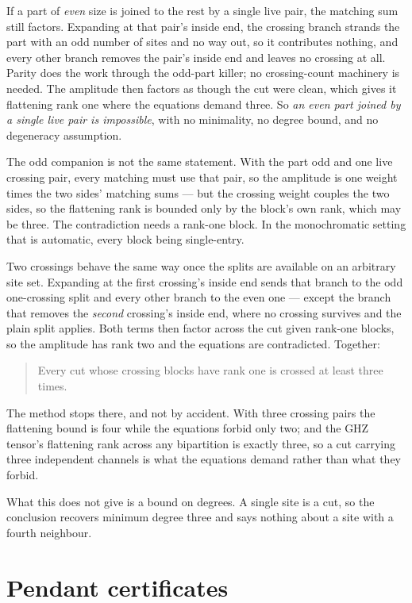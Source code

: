 \documentclass[11pt]{article}
\theoremstyle{definition}
\theoremstyle{remark}
\begin{document}
If a part of \emph{even} size is joined to the rest by a single live pair, the matching sum
still factors. Expanding at that pair's inside end, the crossing branch strands the part with
an odd number of sites and no way out, so it contributes nothing, and every other branch
removes the pair's inside end and leaves no crossing at all. Parity does the work through the
odd-part killer; no crossing-count machinery is needed. The amplitude then factors as though
the cut were clean, which gives it flattening rank one where the equations demand three. So
\emph{an even part joined by a single live pair is impossible}, with no minimality, no degree
bound, and no degeneracy assumption.

The odd companion is not the same statement. With the part odd and one live crossing pair,
every matching must use that pair, so the amplitude is one weight times the two sides' matching
sums --- but the crossing weight couples the two sides, so the flattening rank is bounded only
by the block's own rank, which may be three. The contradiction needs a rank-one block. In the
monochromatic setting that is automatic, every block being single-entry.

Two crossings behave the same way once the splits are available on an arbitrary site set.
Expanding at the first crossing's inside end sends that branch to the odd one-crossing split
and every other branch to the even one --- except the branch that removes the \emph{second}
crossing's inside end, where no crossing survives and the plain split applies. Both terms then
factor across the cut given rank-one blocks, so the amplitude has rank two and the equations
are contradicted. Together:

\begin{quote}
Every cut whose crossing blocks have rank one is crossed at least three times.
\end{quote}

The method stops there, and not by accident. With three crossing pairs the flattening bound is
four while the equations forbid only two; and the GHZ tensor's flattening rank across any
bipartition is exactly three, so a cut carrying three independent channels is what the
equations demand rather than what they forbid.

What this does not give is a bound on degrees. A single site is a cut, so the conclusion
recovers minimum degree three and says nothing about a site with a fourth neighbour.

\section{Pendant certificates}\label{sec:pendant}
\end{document}
